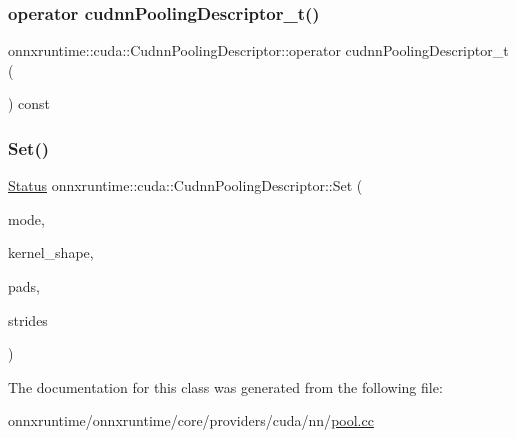 \subsubsection{\texorpdfstring{operator cudnn\+Pooling\+Descriptor\+\_\+t()}{operator cudnnPoolingDescriptor\_t()}}
{\footnotesize\ttfamily onnxruntime\+::cuda\+::\+Cudnn\+Pooling\+Descriptor\+::operator cudnn\+Pooling\+Descriptor\+\_\+t (\begin{DoxyParamCaption}{ }\end{DoxyParamCaption}) const\hspace{0.3cm}{\ttfamily [inline]}}

\mbox{\label{classonnxruntime_1_1cuda_1_1CudnnPoolingDescriptor_aab1a9ed2ecd33fa0cfd5a173bf4c9f35}} 
\subsubsection{\texorpdfstring{Set()}{Set()}}
{\footnotesize\ttfamily \mbox{\hyperlink{classonnxruntime_1_1common_1_1Status}{Status}} onnxruntime\+::cuda\+::\+Cudnn\+Pooling\+Descriptor\+::\+Set (\begin{DoxyParamCaption}\item[{cudnn\+Pooling\+Mode\+\_\+t}]{mode,  }\item[{const std\+::vector$<$ int64\+\_\+t $>$ \&}]{kernel\+\_\+shape,  }\item[{const std\+::vector$<$ int64\+\_\+t $>$ \&}]{pads,  }\item[{const std\+::vector$<$ int64\+\_\+t $>$ \&}]{strides }\end{DoxyParamCaption})\hspace{0.3cm}{\ttfamily [inline]}}



The documentation for this class was generated from the following file\+:\begin{DoxyCompactItemize}
\item 
onnxruntime/onnxruntime/core/providers/cuda/nn/\mbox{\hyperlink{cuda_2nn_2pool_8cc}{pool.\+cc}}\end{DoxyCompactItemize}
